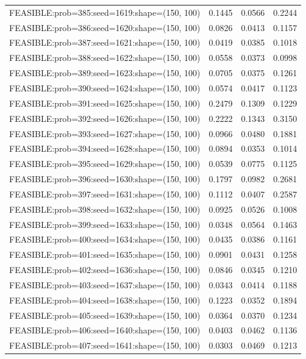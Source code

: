 \begin{longtable}{lccc}
FEASIBLE:prob=385:seed=1619:shape=(150, 100) & 0.1445 & 0.0566 & 0.2244 \\
FEASIBLE:prob=386:seed=1620:shape=(150, 100) & 0.0826 & 0.0413 & 0.1157 \\
FEASIBLE:prob=387:seed=1621:shape=(150, 100) & 0.0419 & 0.0385 & 0.1018 \\
FEASIBLE:prob=388:seed=1622:shape=(150, 100) & 0.0558 & 0.0373 & 0.0998 \\
FEASIBLE:prob=389:seed=1623:shape=(150, 100) & 0.0705 & 0.0375 & 0.1261 \\
FEASIBLE:prob=390:seed=1624:shape=(150, 100) & 0.0574 & 0.0417 & 0.1123 \\
FEASIBLE:prob=391:seed=1625:shape=(150, 100) & 0.2479 & 0.1309 & 0.1229 \\
FEASIBLE:prob=392:seed=1626:shape=(150, 100) & 0.2222 & 0.1343 & 0.3150 \\
FEASIBLE:prob=393:seed=1627:shape=(150, 100) & 0.0966 & 0.0480 & 0.1881 \\
FEASIBLE:prob=394:seed=1628:shape=(150, 100) & 0.0894 & 0.0353 & 0.1014 \\
FEASIBLE:prob=395:seed=1629:shape=(150, 100) & 0.0539 & 0.0775 & 0.1125 \\
FEASIBLE:prob=396:seed=1630:shape=(150, 100) & 0.1797 & 0.0982 & 0.2681 \\
FEASIBLE:prob=397:seed=1631:shape=(150, 100) & 0.1112 & 0.0407 & 0.2587 \\
FEASIBLE:prob=398:seed=1632:shape=(150, 100) & 0.0925 & 0.0526 & 0.1008 \\
FEASIBLE:prob=399:seed=1633:shape=(150, 100) & 0.0348 & 0.0564 & 0.1463 \\
FEASIBLE:prob=400:seed=1634:shape=(150, 100) & 0.0435 & 0.0386 & 0.1161 \\
FEASIBLE:prob=401:seed=1635:shape=(150, 100) & 0.0901 & 0.0431 & 0.1258 \\
FEASIBLE:prob=402:seed=1636:shape=(150, 100) & 0.0846 & 0.0345 & 0.1210 \\
FEASIBLE:prob=403:seed=1637:shape=(150, 100) & 0.0343 & 0.0414 & 0.1188 \\
FEASIBLE:prob=404:seed=1638:shape=(150, 100) & 0.1223 & 0.0352 & 0.1894 \\
FEASIBLE:prob=405:seed=1639:shape=(150, 100) & 0.0364 & 0.0370 & 0.1234 \\
FEASIBLE:prob=406:seed=1640:shape=(150, 100) & 0.0403 & 0.0462 & 0.1136 \\
FEASIBLE:prob=407:seed=1641:shape=(150, 100) & 0.0303 & 0.0469 & 0.1213 \\

\end{longtable}
